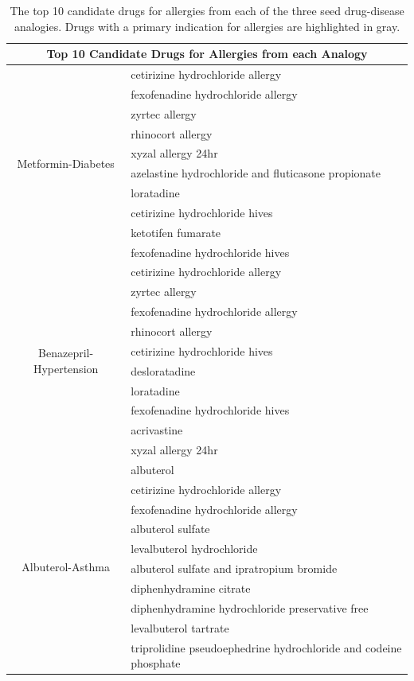 \documentclass{article}
\newcommand{\lgc}[1]{\cellcolor[gray]{0.85}#1}
\begin{document}
\begin{table}[t!]
\footnotesize
\centering
\caption{The top 10 candidate drugs for allergies from each of the three seed drug-disease analogies. Drugs with a primary indication for allergies are highlighted in gray.}
\label{tab:drugs_val_alrg}
\begin{tabular}{c l}
\hline
\multicolumn{2}{c}{Top 10 Candidate Drugs for Allergies from each Analogy} \\
\hline
\multirow{10}{*}{Metformin-Diabetes} & \lgc{cetirizine hydrochloride allergy} \\
& \lgc{fexofenadine hydrochloride allergy} \\
& \lgc{zyrtec allergy} \\
& \lgc{rhinocort allergy} \\
& \lgc{xyzal allergy 24hr} \\
& \lgc{azelastine hydrochloride and fluticasone propionate} \\
& \lgc{loratadine} \\
& \lgc{cetirizine hydrochloride hives} \\
& \lgc{ketotifen fumarate} \\
& \lgc{fexofenadine hydrochloride hives} \\
\hline
\multirow{10}{*}{Benazepril-Hypertension} & \lgc{cetirizine hydrochloride allergy} \\
& \lgc{zyrtec allergy} \\
& \lgc{fexofenadine hydrochloride allergy} \\
& \lgc{rhinocort allergy} \\
& \lgc{cetirizine hydrochloride hives} \\
& \lgc{desloratadine} \\
& \lgc{loratadine} \\
& \lgc{fexofenadine hydrochloride hives} \\
& \lgc{acrivastine} \\
& \lgc{xyzal allergy 24hr} \\
\hline
\multirow{10}{*}{Albuterol-Asthma} & albuterol \\
& \lgc{cetirizine hydrochloride allergy} \\
& \lgc{fexofenadine hydrochloride allergy} \\
& albuterol sulfate \\
& levalbuterol hydrochloride \\
& albuterol sulfate and ipratropium bromide \\
& \lgc{diphenhydramine citrate} \\
& \lgc{diphenhydramine hydrochloride preservative free} \\
& levalbuterol tartrate \\
& \lgc{triprolidine pseudoephedrine hydrochloride and codeine phosphate} \\
\hline
\end{tabular}
\end{table}
\end{document}

